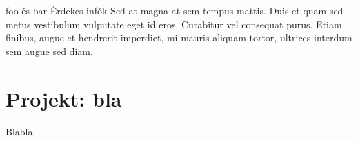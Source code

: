 \begin{infobox}{.75}{foo és bar}
  Érdekes infók Sed at magna at sem tempus
  mattis. Duis et quam sed metus vestibulum
  vulputate eget id eros. Curabitur vel consequat
  purus. Etiam finibus, augue et hendrerit
  imperdiet, mi mauris aliquam tortor, ultrices
  interdum sem augue sed diam.
\end{infobox}
\section{Projekt: bla}
Blabla
